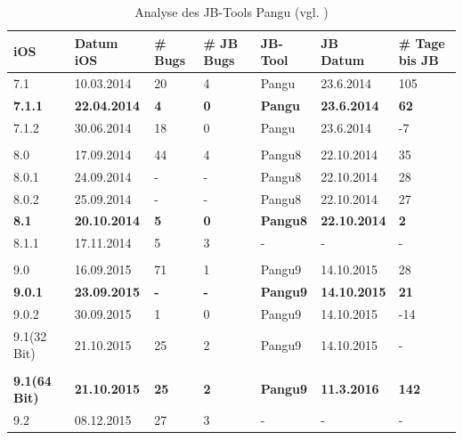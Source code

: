 \begin{table}[hp!]
    \begin{center}
        \begin{tabular}{| p{15mm} | p{20mm} | p{17mm} | p{12mm} | p{20mm} | p{22mm} | p{15mm} |} \hline
            \textbf{iOS} & \textbf{Datum iOS} & \textbf{\# Bugs} & \textbf{\# JB Bugs} & \textbf{JB-Tool} & \textbf{JB Datum} & \textbf{\# Tage bis JB} \\ \hline 
7.1 & 10.03.2014 & 20 & 4 & Pangu & 23.6.2014 & 105 \\ \hline
\textbf{7.1.1} & \textbf{22.04.2014} & \textbf{4} & \textbf{0} & \textbf{Pangu} & \textbf{23.6.2014} & \textbf{62} \\ \hline
7.1.2 & 30.06.2014 & 18 & 0 & Pangu & 23.6.2014 & -7 \\ \hline
 & & & & & & \\ \hline
8.0 & 17.09.2014 & 44 & 4 & Pangu8 & 22.10.2014 & 35 \\ \hline
8.0.1 & 24.09.2014 & - & - & Pangu8 & 22.10.2014 & 28 \\ \hline
8.0.2 & 25.09.2014 & - & - & Pangu8 & 22.10.2014 & 27 \\ \hline
\textbf{8.1} & \textbf{20.10.2014} & \textbf{5} & \textbf{0} & \textbf{Pangu8} & \textbf{22.10.2014} & \textbf{2} \\ \hline
8.1.1 & 17.11.2014 & 5 & 3 & - & - & - \\ \hline
 & & & & & & \\ \hline
9.0& 16.09.2015 & 71 & 1 & Pangu9 & 14.10.2015 & 28  \\ \hline
\textbf{9.0.1} & \textbf{23.09.2015} & \textbf{-} & \textbf{-} & \textbf{Pangu9} & \textbf{14.10.2015} & \textbf{21}\\ \hline
9.0.2 & 30.09.2015 & 1 & 0 & Pangu9 & 14.10.2015 & -14 \\ \hline
9.1(32 Bit) & 21.10.2015 & 25 & 2 & Pangu9 & 14.10.2015 & -  \\ \hline
		 & & & & & & \\ \hline				
\textbf{9.1(64 Bit)} & \textbf{21.10.2015} & \textbf{25} & \textbf{2} & \textbf{Pangu9} & \textbf{11.3.2016} & \textbf{142}  \\ \hline
9.2 & 08.12.2015	 & 27 & 3 & - & - & - \\ \hline		
     \end{tabular} 
        \caption{Analyse des JB-Tools Pangu (vgl. \cite{Apple[7]}) \protect\footnotemark}
        \label{tab:AnalysePangu}
    \end{center}
\end{table}

